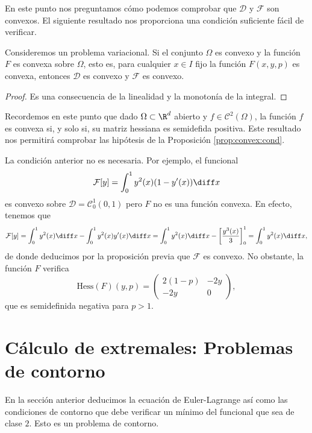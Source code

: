 \documentclass{article}
\begin{document}
En este punto nos preguntamos cómo podemos comprobar que $\mathcal{D}$ y $\mathcal{F}$ son
convexos. El siguiente resultado nos proporciona una condición suficiente fácil de verificar.

\begin{prop} \label{prop:convex:cond} Consideremos un problema
  variacional. Si el conjunto $\Omega$ es convexo y la función $F$ es convexa sobre $\Omega$, esto
  es, para cualquier $x \in I$ fijo la función $F(x, y, p)$ es convexa, entonces $\mathcal{D}$ es
  convexo y $\mathcal{F}$ es convexo.
\end{prop}
\begin{proof}
  Es una consecuencia de la linealidad y la monotonía de la integral.
\end{proof}

\begin{remark}
  Recordemos en este punto que dado $\Omega \subset \R^d$ abierto y $f \in \mathcal{C}^2(\Omega)$,
  la función $f$ es convexa si, y solo si, su matriz hessiana es semidefida positiva. Este resultado
  nos permitirá comprobar las hipótesis de la Proposición \ref{prop:convex:cond}.
\end{remark}

\begin{remark}
  La condición anterior no es necesaria. Por ejemplo, el funcional
  \[ \mathcal{F}[y] = \int_0^1 y^2(x)(1 - y'(x)) \diff x \] es convexo sobre
  $\mathcal{D} = \mathcal{C}_0^1(0,1)$ pero $F$ no es una función convexa.  En efecto, tenemos que
  \[ \mathcal{F}[y] = \int_0^1 y^2(x) \diff x - \int_0^1 y^2(x)y'(x) \diff x = \int_0^1 y^2(x) \diff
    x - \left[ \frac{y^3(x)}{3}\right]^1_0 = \int_0^1 y^2(x) \diff x, \] de donde deducimos por la
  proposición previa que $\mathcal{F}$ es convexo. No obstante, la función $F$ verifica
  \[ \mathrm{Hess}(F)(y,p) = \left(
      \begin{matrix}
        2(1-p) & -2y \\
        -2y & 0
      \end{matrix}
    \right), \] que es semidefinida negativa para $p > 1$.
\end{remark}

\section{Cálculo de extremales: Problemas de contorno}

En la sección anterior deducimos la ecuación de Euler-Lagrange así como las condiciones de contorno
que debe verificar un mínimo del funcional que sea de clase $2$. Esto es un problema de contorno.
\end{document}
